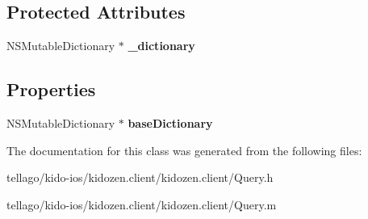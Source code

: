 \subsection*{Protected Attributes}
\begin{DoxyCompactItemize}
\item 
\hypertarget{interface_query_a95ab82067840b91b26f528ef2c3b12ca}{N\-S\-Mutable\-Dictionary $\ast$ {\bfseries \-\_\-dictionary}}\label{interface_query_a95ab82067840b91b26f528ef2c3b12ca}

\end{DoxyCompactItemize}
\subsection*{Properties}
\begin{DoxyCompactItemize}
\item 
\hypertarget{interface_query_ab7b9f2f200c9dc4d81445b29acb93d92}{N\-S\-Mutable\-Dictionary $\ast$ {\bfseries base\-Dictionary}}\label{interface_query_ab7b9f2f200c9dc4d81445b29acb93d92}

\end{DoxyCompactItemize}


The documentation for this class was generated from the following files\-:\begin{DoxyCompactItemize}
\item 
tellago/kido-\/ios/kidozen.\-client/kidozen.\-client/Query.\-h\item 
tellago/kido-\/ios/kidozen.\-client/kidozen.\-client/Query.\-m\end{DoxyCompactItemize}

